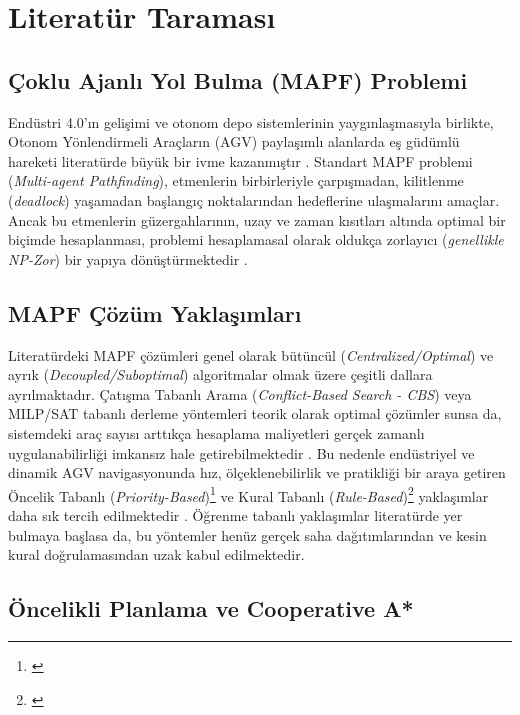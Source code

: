 \section{Literatür Taraması}

\subsection{Çoklu Ajanlı Yol Bulma (MAPF) Problemi}

Endüstri 4.0'ın gelişimi ve otonom depo sistemlerinin yaygınlaşmasıyla birlikte, Otonom Yönlendirmeli Araçların (AGV) paylaşımlı alanlarda eş güdümlü hareketi literatürde büyük bir ivme kazanmıştır \citep{WUReview2023}. Standart MAPF problemi (\textit{Multi-agent Pathfinding}), etmenlerin birbirleriyle çarpışmadan, kilitlenme (\textit{deadlock}) yaşamadan başlangıç noktalarından hedeflerine ulaşmalarını amaçlar. Ancak bu etmenlerin güzergahlarının, uzay ve zaman kısıtları altında optimal bir biçimde hesaplanması, problemi hesaplamasal olarak oldukça zorlayıcı (\textit{genellikle NP-Zor}) bir yapıya dönüştürmektedir \citep{SURYNEKProblem2022a}.

\subsection{MAPF Çözüm Yaklaşımları}

Literatürdeki MAPF çözümleri genel olarak bütüncül (\textit{Centralized/Optimal}) ve ayrık (\textit{Decoupled/Suboptimal}) algoritmalar olmak üzere çeşitli dallara ayrılmaktadır. Çatışma Tabanlı Arama (\textit{Conflict-Based Search - CBS}) \citep{SHARONConflictbased2015} veya MILP/SAT tabanlı derleme yöntemleri teorik olarak optimal çözümler sunsa da, sistemdeki araç sayısı arttıkça hesaplama maliyetleri gerçek zamanlı uygulanabilirliği imkansız hale getirebilmektedir \citep{SURYNEKProblem2022a}. Bu nedenle endüstriyel ve dinamik AGV navigasyonunda hız, ölçeklenebilirlik ve pratikliği bir araya getiren Öncelik Tabanlı (\textit{Priority-Based})\footnote{\citep{MASearching2019}} ve Kural Tabanlı (\textit{Rule-Based})\footnote{\citep{SAJIDMultiAgent2021} \citep{OKUMURAPriority2022} \citep{WANGWalk2020}} yaklaşımlar daha sık tercih edilmektedir \citep{WUReview2023} . Öğrenme tabanlı yaklaşımlar literatürde yer bulmaya başlasa da, bu yöntemler henüz gerçek saha dağıtımlarından ve kesin kural doğrulamasından uzak kabul edilmektedir.

\subsection{Öncelikli Planlama ve Cooperative A*}

